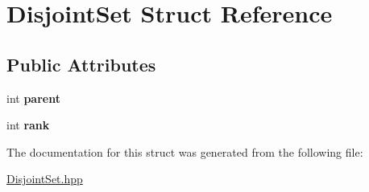 \hypertarget{struct_disjoint_set}{\section{Disjoint\-Set Struct Reference}
\label{struct_disjoint_set}
}
\subsection*{Public Attributes}
\begin{DoxyCompactItemize}
\item 
\hypertarget{struct_disjoint_set_a4112a3a41c0dd51fa9dc2697962c9cee}{int {\bfseries parent}}\label{struct_disjoint_set_a4112a3a41c0dd51fa9dc2697962c9cee}

\item 
\hypertarget{struct_disjoint_set_aee9c9d6140054cdd8ea78470f6ec612c}{int {\bfseries rank}}\label{struct_disjoint_set_aee9c9d6140054cdd8ea78470f6ec612c}

\end{DoxyCompactItemize}


The documentation for this struct was generated from the following file\-:\begin{DoxyCompactItemize}
\item 
\hyperlink{_disjoint_set_8hpp}{Disjoint\-Set.\-hpp}\end{DoxyCompactItemize}
